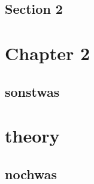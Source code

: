 \documentclass{book}
\begin{document}
\section[section2]{Section 2}
\lipsum[4-7]







\chapter[chapter2]{Chapter 2}
\section[section3]{sonstwas}


\chapter[theory]{theory}
\section[section3]{nochwas}

\end{document}
